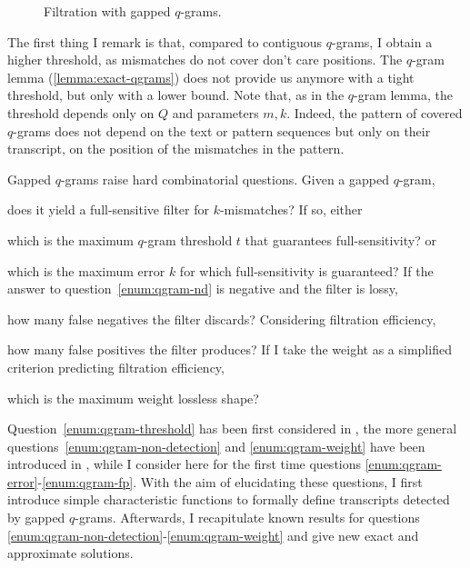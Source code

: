 \begin{figure}[h]
\begin{center}
\caption[Filtration with gapped $q$-grams]{Filtration with gapped $q$-grams.}
\label{fig:qgrams-gapped}

\end{center}
\end{figure}

The first thing I remark is that, compared to contiguous $q$-grams, I obtain a higher threshold, as mismatches do not cover don't care positions.
The $q$-gram lemma (\ref{lemma:exact-qgrams}) does not provide us anymore with a tight threshold, but only with a lower bound.
Note that, as in the $q$-gram lemma, the threshold depends only on $Q$ and parameters $m,k$.
Indeed, the pattern of covered $q$-grams does not depend on the text or pattern sequences but only on their transcript, \ie on the position of the mismatches in the pattern.


Gapped $q$-grams raise hard combinatorial questions. Given a gapped $q$-gram, 
\begin{inparaenum}[(i)]
\item \label{enum:qgram-non-detection} does it yield a full-sensitive filter for $k$-mismatches? If so, either
\item \label{enum:qgram-threshold} which is the maximum $q$-gram threshold $t$ that guarantees full-sensitivity? or 
\item \label{enum:qgram-error} which is the maximum error $k$ for which full-sensitivity is guaranteed?
If the answer to question~\ref{enum:qgram-nd} is negative and the filter is lossy,
\item \label{enum:qgram-fn} how many false negatives the filter discards?
Considering filtration efficiency,
\item \label{enum:qgram-fp} how many false positives the filter produces?
If I take the weight as a simplified criterion predicting filtration efficiency, 
\item \label{enum:qgram-weight} which is the maximum weight lossless shape?
\end{inparaenum}

Question~\ref{enum:qgram-threshold} has been first considered in \citep{Burkhardt2001,Kucherov2005},
the more general questions~\ref{enum:qgram-non-detection} and \ref{enum:qgram-weight} have been introduced in \citep{Nicolas2005}, while I consider here for the first time questions \ref{enum:qgram-error}-\ref{enum:qgram-fp}.
With the aim of elucidating these questions, I first introduce simple characteristic functions to formally define transcripts detected by gapped $q$-grams.
Afterwards, I recapitulate known results for questions \ref{enum:qgram-non-detection}-\ref{enum:qgram-weight} and give new exact and approximate solutions.


